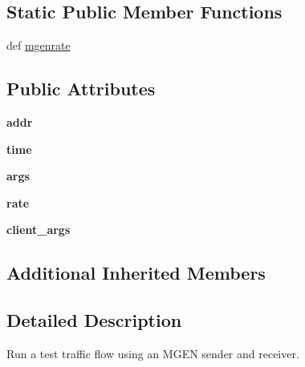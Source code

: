 \subsection*{Static Public Member Functions}
\begin{DoxyCompactItemize}
\item 
def \hyperlink{classwlanemanetests_1_1_mgen_cmd_a97cd2459725a138997d81bd8e9e2c325}{mgenrate}
\end{DoxyCompactItemize}
\subsection*{Public Attributes}
\begin{DoxyCompactItemize}
\item 
\hypertarget{classwlanemanetests_1_1_mgen_cmd_a40ee74b38b88126d4b1a814f16ed9b07}{{\bfseries addr}}\label{classwlanemanetests_1_1_mgen_cmd_a40ee74b38b88126d4b1a814f16ed9b07}

\item 
\hypertarget{classwlanemanetests_1_1_mgen_cmd_ac889a1cff7e2c523f226c931b8bc1d5e}{{\bfseries time}}\label{classwlanemanetests_1_1_mgen_cmd_ac889a1cff7e2c523f226c931b8bc1d5e}

\item 
\hypertarget{classwlanemanetests_1_1_mgen_cmd_a6f885965601c033ba126bda091461c21}{{\bfseries args}}\label{classwlanemanetests_1_1_mgen_cmd_a6f885965601c033ba126bda091461c21}

\item 
\hypertarget{classwlanemanetests_1_1_mgen_cmd_aac919e7dda28b2dcf1f0aae39f3dbce4}{{\bfseries rate}}\label{classwlanemanetests_1_1_mgen_cmd_aac919e7dda28b2dcf1f0aae39f3dbce4}

\item 
\hypertarget{classwlanemanetests_1_1_mgen_cmd_af6307bc557d03a7fb5f555a21ed8aef1}{{\bfseries client\+\_\+args}}\label{classwlanemanetests_1_1_mgen_cmd_af6307bc557d03a7fb5f555a21ed8aef1}

\end{DoxyCompactItemize}
\subsection*{Additional Inherited Members}


\subsection{Detailed Description}
\begin{DoxyVerb}Run a test traffic flow using an MGEN sender and receiver.
\end{DoxyVerb}
 

